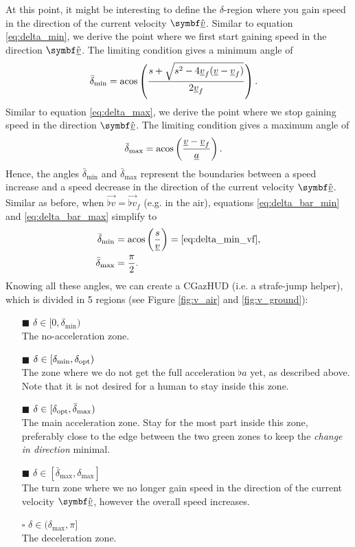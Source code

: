 At this point, it might be interesting to define the $\delta$-region where you gain speed in the direction of the current velocity $\uvec{\flat{v}}$. Similar to equation \eqref{eq:delta_min}, we derive the point where we first start gaining speed in the direction $\uvec{\flat{v}}$. The limiting condition gives a minimum angle of
\begin{align}
\label{eq:delta_bar_min}
\bar{\delta}_{\min} &= \acos\left( \frac{s + \sqrt{s^2 - 4 \flat{v}_f (\flat{v} - \flat{v}_f)}}{2 \flat{v}_f} \right).
\end{align}
Similar to equation \eqref{eq:delta_max}, we derive the point where we stop gaining speed in the direction $\uvec{\flat{v}}$. The limiting condition gives a maximum angle of
\begin{align}
\label{eq:delta_bar_max}
\bar{\delta}_{\max} &= \acos\left( \frac{\flat{v} - \flat{v}_f}{\flat{a}} \right).
\end{align}
Hence, the angles $\bar{\delta}_{\min}$ and $\bar{\delta}_{\max}$ represent the boundaries between a speed increase and a speed decrease in the direction of the current velocity $\uvec{\flat{v}}$. Similar as before, when $\vec{\flat{v}} = \vec{\flat{v}}_f$ (e.g. in the air), equations \eqref{eq:delta_bar_min} and \eqref{eq:delta_bar_max} simplify to
\begin{align}
\label{eq:delta_bar_min_vf}
\bar{\delta}_{\min} &= \acos\left(\frac{s}{\flat{v}} \right) = \eqref{eq:delta_min_vf},\\
\label{eq:delta_bar_max_vf}
\bar{\delta}_{\max} &= \frac{\pi}{2}.
\end{align}
Knowing all these angles, we can create a CGazHUD (i.e. a strafe-jump helper), which is divided in 5 regions (see Figure \ref{fig:v_air} and \ref{fig:v_ground}):
\begin{itemize}
	\item[\textcolor{cgazgrey!50}{$\blacksquare$}] $\delta \in [0, \delta_{\min})$\\
	The no-acceleration zone.
	\item[\textcolor{cgazgreen!50}{$\blacksquare$}] $\delta \in [\delta_{\min}, \delta_{\operatorname{opt}})$\\
	The zone where we do not get the full acceleration $\flat{a}$ yet, as described above. Note that it is not desired for a human to stay inside this zone.
	\item[\textcolor{cgazdarkgreen!50}{$\blacksquare$}] $\delta \in [\delta_{\operatorname{opt}}, \bar{\delta}_{\max})$\\
	The main acceleration zone. Stay for the most part inside this zone, preferably close to the edge between the two green zones to keep the \emph{change in direction} minimal.
	\item[\textcolor{cgazyellow!50}{$\blacksquare$}] $\delta \in [\bar{\delta}_{\max}, \delta_{\max}]$\\
	The turn zone where we no longer gain speed in the direction of the current velocity $\uvec{\flat{v}}$, however the overall speed increases.
	\item[$\square$] $\delta \in (\delta_{\max}, \pi]$\\
	The deceleration zone.
\end{itemize}

